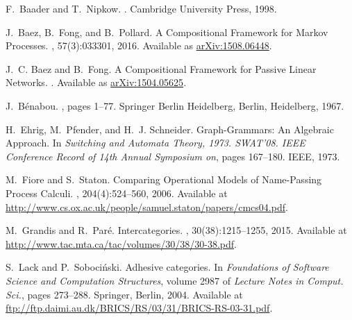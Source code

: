 \documentclass[11pt]{amsart}
\theoremstyle{remark}
\theoremstyle{definition}
\begin{document}
%
%

%
\begin{thebibliography}{10}
	
	F.~Baader and T.~Nipkow.
	.
	\newblock Cambridge University Press, 1998.
	
	J.~Baez, B.~Fong, and B.~Pollard.
	\newblock A {C}ompositional {F}ramework for {M}arkov {P}rocesses.
	, 57(3):033301, 2016.
	\newblock Available as
	\href{https://arxiv.org/abs/1508.06448}{arXiv:1508.06448}.
	
	J.~C. Baez and B.~Fong.
	\newblock A {C}ompositional {F}ramework for {P}assive {L}inear {N}etworks.
	.
	\newblock Available as
	\href{https://arxiv.org/abs/1504.05625}{arXiv:1504.05625}.
	
	J.~B{\'e}nabou.
	, pages 1--77.
	\newblock Springer Berlin Heidelberg, Berlin, Heidelberg, 1967.
	
	H.~Ehrig, M.~Pfender, and H.~J. Schneider.
	\newblock Graph-{G}rammars: An {A}lgebraic {A}pproach.
	\newblock In {\em Switching and Automata Theory, 1973. SWAT'08. IEEE Conference
		Record of 14th Annual Symposium on}, pages 167--180. IEEE, 1973.
	
	M.~Fiore and S.~Staton.
	\newblock Comparing {O}perational {M}odels of {N}ame-{P}assing {P}rocess
	{C}alculi.
	, 204(4):524--560, 2006.
	\newblock Available at
	\href{http://www.cs.ox.ac.uk/people/samuel.staton/papers/cmcs04.pdf}{http://www.cs.ox.ac.uk/people/samuel.staton/papers/cmcs04.pdf}.
	
	M.~Grandis and R.~Par\'{e}.
	\newblock Intercategories.
	, 30(38):1215--1255, 2015.
	\newblock Available at
	\href{http://www.tac.mta.ca/tac/volumes/30/38/30-38.pdf}{http://www.tac.mta.ca/tac/volumes/30/38/30-38.pdf}.
	
	S.~Lack and P.~Soboci{\'n}ski.
	\newblock Adhesive categories.
	\newblock In {\em Foundations of {S}oftware {S}cience and {C}omputation
		{S}tructures}, volume 2987 of {\em Lecture Notes in Comput. Sci.}, pages
	273--288. Springer, Berlin, 2004.
	\newblock Available at
	\href{ftp://ftp.daimi.au.dk/BRICS/RS/03/31/BRICS-RS-03-31.pdf}{ftp://ftp.daimi.au.dk/BRICS/RS/03/31/BRICS-RS-03-31.pdf}.
	

\end{thebibliography}
\end{document}
